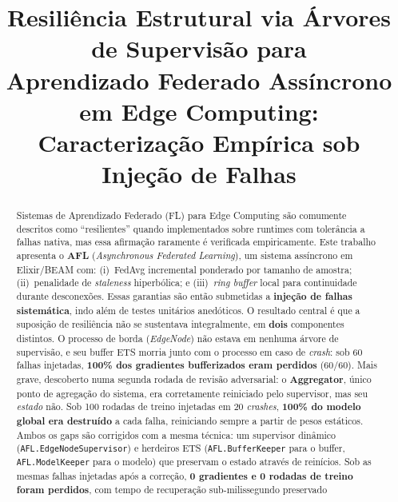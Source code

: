\documentclass[conference,a4paper]{IEEEtran}
\begin{document}
\title{%
  \textbf{Resiliência Estrutural via Árvores de Supervisão para\\
  Aprendizado Federado Assíncrono em Edge Computing:\\
  Caracterização Empírica sob Injeção de Falhas}%
}

\author{%
}

\maketitle

\begin{abstract}
Sistemas de Aprendizado Federado (FL) para Edge Computing são comumente
descritos como ``resilientes'' quando implementados sobre runtimes com
tolerância a falhas nativa, mas essa afirmação raramente é verificada
empiricamente. Este trabalho apresenta o \textbf{AFL} (\textit{Asynchronous
Federated Learning}), um sistema assíncrono em Elixir/BEAM com: (i)~FedAvg
incremental ponderado por tamanho de amostra; (ii)~penalidade de
\textit{staleness} hiperbólica; e (iii)~\textit{ring buffer} local para
continuidade durante desconexões. Essas garantias são então submetidas a
\textbf{injeção de falhas sistemática}, indo além de testes unitários
anedóticos. O resultado central é que a suposição de resiliência não se
sustentava integralmente, em \textbf{dois} componentes distintos. O
processo de borda (\textit{EdgeNode}) não estava em nenhuma árvore de
supervisão, e seu buffer ETS morria junto com o processo em caso de
\textit{crash}: sob 60 falhas injetadas, \textbf{100\% dos gradientes
bufferizados eram perdidos} (60/60). Mais grave, descoberto numa segunda
rodada de revisão adversarial: o \textbf{Aggregator}, único ponto de
agregação do sistema, era corretamente reiniciado pelo supervisor, mas
seu \emph{estado} não. Sob 100 rodadas de treino injetadas em 20
\textit{crashes}, \textbf{100\% do modelo global era destruído} a cada
falha, reiniciando sempre a partir de pesos estáticos. Ambos os gaps são
corrigidos com a mesma técnica: um supervisor dinâmico
(\texttt{AFL.EdgeNodeSupervisor}) e herdeiros ETS
(\texttt{AFL.BufferKeeper} para o buffer, \texttt{AFL.ModelKeeper} para o
modelo) que preservam o estado através de reinícios. Sob as mesmas falhas
injetadas após a correção, \textbf{0 gradientes e 0 rodadas de treino
foram perdidos}, com tempo de recuperação sub-milissegundo preservado

\end{abstract}
\end{document}
